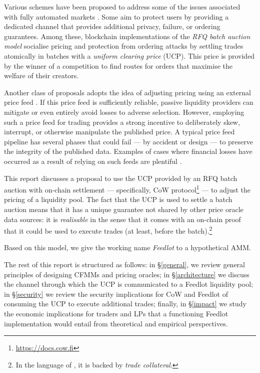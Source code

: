 \documentclass[a4paper,10pt]{article}
\theoremstyle{remark}
\begin{document}
Various schemes have been proposed to address some of the issues associated with fully automated markets \cite{ferreira2022credible, josojo2022mev, nikete2022towards, fleupold2022cow}.
%
Some aim to protect users by providing a dedicated channel that provides additional privacy, failure, or ordering guarantees.
%
Among these, blockchain implementations of the \emph{RFQ batch auction model} socialise pricing and protection from ordering attacks by settling trades atomically in batches with a \emph{uniform clearing price} (UCP).
%
This price is provided by the winner of a competition to find routes for orders that maximise the welfare of their creators.

Another class of proposals adopts the idea of adjusting pricing using an external price feed \cite{dodoex,synthetixlitepaper}.
%
If this price feed is sufficiently reliable, passive liquidity providers can mitigate or even entirely avoid losses to adverse selection.
%
However, employing such a price feed for trading provides a strong incentive to deliberately skew, interrupt, or otherwise manipulate the published price.
%
A typical price feed pipeline has several phases that could fail --- by accident or design --- to preserve the integrity of the published data. 
%
Examples of cases where financial losses have occurred as a result of relying on such feeds are plentiful \cite{liu2021first, cryptocat2020how, venus2022luna, eskandari2021sok}.

This report discusses a proposal to use the UCP provided by an RFQ batch auction with on-chain settlement --- specifically, CoW protocol\footnote{\url{https://docs.cow.fi}} --- to adjust the pricing of a liquidity pool.
%
The fact that the UCP is used to settle a batch auction means that it has a unique guarantee not shared by other price oracle data sources: it is \emph{realisable} in the sense that it comes with an on-chain proof that it could be used to execute trades (at least, before the batch).\footnote{In the language of \cite{suresh2022so}, it is backed by \emph{trade collateral}.}

Based on this model, we give the working name \emph{Feedlot} to a hypothetical AMM.
%

The rest of this report is structured as follows: in \S\ref{general}, we review general principles of designing CFMMs and pricing oracles; 
%
in \S\ref{architecture} we discuss the channel through which the UCP is communicated to a Feedlot liquidity pool; 
%
in \S\ref{security} we review the security implications for CoW and Feedlot of consuming the UCP to execute additional trades;
%
finally, in \S\ref{impact} we study the economic implications for traders and LPs that a functioning Feedlot implementation would entail from theoretical and empirical perspectives.
\end{document}
